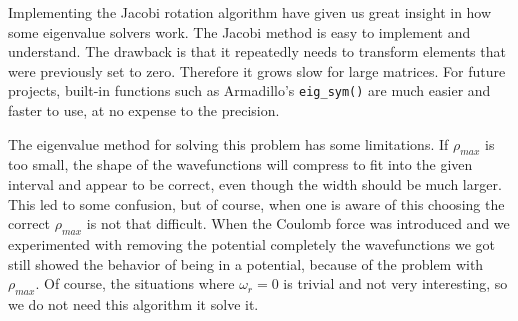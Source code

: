 Implementing the Jacobi rotation algorithm have given us great insight in how some
eigenvalue solvers work. The Jacobi method is easy to implement and understand. The
drawback is that it repeatedly needs to transform elements that were previously set to
zero. Therefore it grows slow for large matrices. For future projects, built-in functions
such as Armadillo's \texttt{eig\_sym()} are much easier and faster to use, at no expense to
the precision.

The eigenvalue method for solving this problem has some limitations. If $\rho_{max}$ is too small, the shape of the wavefunctions will compress to fit into the given interval and appear to be correct, even though the width should be much larger. This led to some confusion, but of course, when one is aware of this choosing the correct $\rho_{max}$ is not that difficult. When the Coulomb force was introduced and we experimented with removing the potential completely the wavefunctions we got still showed the behavior of being in a potential, because of the problem with $\rho_{max}$. Of course, the situations where $\omega_r = 0$ is trivial and not very interesting, so we do not need this algorithm it solve it.
